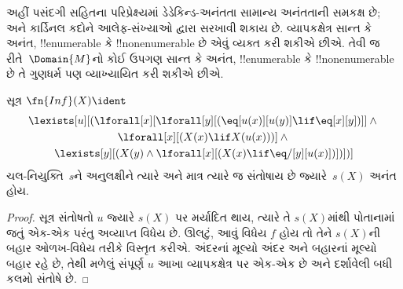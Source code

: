 \documentclass[../../../include/open-logic-section]{subfiles}
\begin{document}


\begin{explain}
અહીં પસંદગી સહિતના પરિપ્રેક્ષ્યમાં ડેડેકિન્ડ-અનંતતા સામાન્ય
અનંતતાની સમકક્ષ છે; અને કાર્ડિનલ કદોને આલેફ-સંખ્યાઓ દ્વારા
સરખાવી શકાય છે.
વ્યાપકક્ષેત્ર સાન્ત કે અનંત, !!{enumerable} કે !!{nonenumerable}
છે એવું વ્યક્ત કરી શકીએ છીએ. તેવી જ રીતે~$\Domain{M}$નો કોઈ ઉપગણ
સાન્ત કે અનંત, !!{enumerable} કે !!{nonenumerable} છે તે ગુણધર્મ
પણ વ્યાખ્યાયિત કરી શકીએ છીએ.
\end{explain}

\begin{prop}
સૂત્ર $\fn{Inf}(X) \ident$
\begin{multline*}
\lexists[u][(\lforall[x][\lforall[y][(\eq[u(x)][u(y)] \lif
      \eq[x][y])]] \land {} \\
\lforall[x][(X(x) \lif X(u(x)))] \land {} \\
\lexists[y][(X(y) \land \lforall[x][(X(x)
      \lif \eq/[y][u(x)])])])]
\end{multline*}
ચલ-નિયુક્તિ~$s$ને અનુલક્ષીને ત્યારે અને માત્ર ત્યારે જ સંતોષાય છે
જ્યારે~$s(X)$ અનંત હોય.
\end{prop}
\begin{proof}
સૂત્ર સંતોષતો $u$ જ્યારે $s(X)$ પર મર્યાદિત થાય, ત્યારે તે
$s(X)$માંથી પોતાનામાં જતું એક-એક પરંતુ અવ્યાપ્ત વિધેય છે.
ઊલટું, આવું વિધેય $f$ હોય તો તેને $s(X)$ની બહાર ઓળખ-વિધેય
તરીકે વિસ્તૃત કરીએ. અંદરનાં મૂલ્યો અંદર અને બહારનાં મૂલ્યો બહાર
રહે છે, તેથી મળેલું સંપૂર્ણ $u$ આખા વ્યાપકક્ષેત્ર પર એક-એક છે
અને દર્શાવેલી બધી કલમો સંતોષે છે.
\end{proof}
\end{document}
